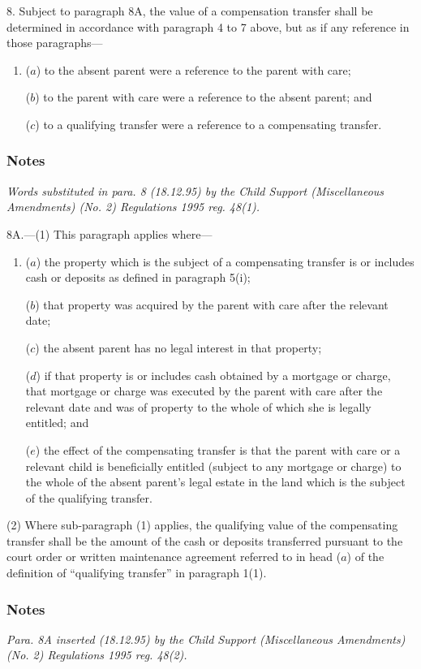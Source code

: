 \documentclass[a4paper]{article}
\newcommand\amendment[1]{\subsubsection*{Notes}{\itshape\frenchspacing\footnotesize #1 \par\goodbreak}}
\begin{document}
8.  
Subject to paragraph 8A, the value of  %
a compensation transfer shall be determined in accordance with paragraph 4 to 7 above, but as if any reference in those paragraphs—
\begin{enumerate}\item[]
($a$) to the absent parent were a reference to the parent with care;

($b$) to the parent with care were a reference to the absent parent; and

($c$) to a qualifying transfer were a reference to a compensating transfer.
\end{enumerate}

\amendment{
Words substituted in para. 8 (18.12.95) by the Child Support (Miscellaneous Amendments) (No. 2) Regulations 1995 reg. 48(1).
}

\medskip

8A.—(1) This paragraph applies where—
\begin{enumerate}\item[]
($a$) the property which is the subject of a compensating transfer is or includes cash or deposits as defined in paragraph 5(i);

($b$) that property was acquired by the parent with care after the relevant date;

($c$) the absent parent has no legal interest in that property;

($d$) if that property is or includes cash obtained by a mortgage or charge, that mortgage or charge was executed by the parent with care after the relevant date and was of property to the whole of which she is legally entitled; and

($e$) the effect of the compensating transfer is that the parent with care or a relevant child is beneficially entitled (subject to any mortgage or charge) to the whole of the absent parent’s legal estate in the land which is the subject of the qualifying transfer.
\end{enumerate}

(2) Where sub-paragraph (1) applies, the qualifying value of the compensating transfer shall be the amount of the cash or deposits transferred pursuant to the court order or written maintenance agreement referred to in head ($a$) of the definition of “qualifying transfer” in paragraph 1(1).

\amendment{
Para. 8A inserted (18.12.95) by the Child Support (Miscellaneous Amendments) (No. 2) Regulations 1995 reg. 48(2).
}
\end{document}
